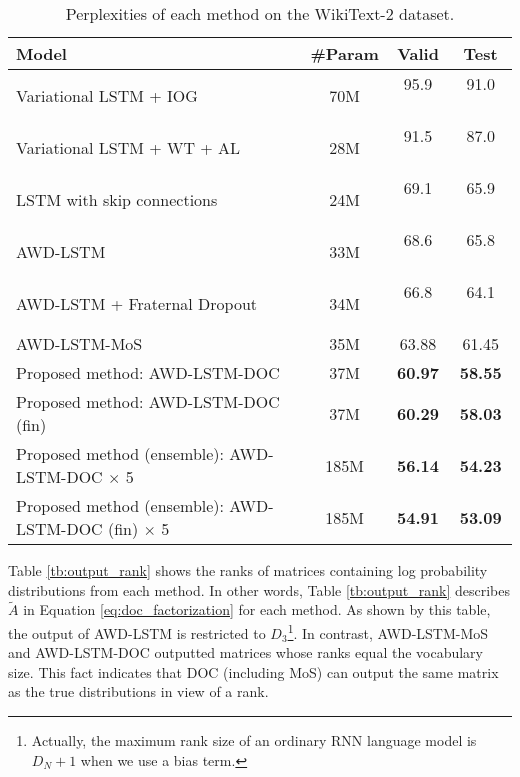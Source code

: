 \documentclass[11pt,a4paper]{article}
\begin{document}
\begin{table*}[!t]
  \centering
  \small
  \begin{tabular}{| l | c | c c |} \hline
  Model & \#Param & Valid & Test \\ \hline
  Variational LSTM + IOG \cite{takase-suzuki-nagata:2017:I17-2} & 70M & 95.9  \ \  & 91.0 \ \  \\
  Variational LSTM + WT + AL \cite{DBLP:journals/corr/InanKS16} & 28M & 91.5  \ \ & 87.0 \ \  \\
  LSTM with skip connections \cite{DBLP:journals/corr/MelisDB17} & 24M & 69.1  \ \  & 65.9 \ \  \\
  AWD-LSTM \cite{merityRegOpt} & 33M & 68.6  \ \  & 65.8 \ \  \\
  AWD-LSTM + Fraternal Dropout \cite{fraternal} & 34M & 66.8  \ \  & 64.1 \ \  \\
  AWD-LSTM-MoS \cite{DBLP:journals/corr/abs-1711-03953} & 35M & 63.88 & 61.45 \\ \hline
  Proposed method: AWD-LSTM-DOC & 37M & {\bf 60.97} & {\bf 58.55} \\
  Proposed method: AWD-LSTM-DOC (fin) & 37M & {\bf 60.29} & {\bf 58.03} \\
  Proposed method (ensemble): AWD-LSTM-DOC $\times$ 5 & 185M & {\bf 56.14} & {\bf 54.23} \\
  Proposed method (ensemble): AWD-LSTM-DOC (fin) $\times$ 5 & 185M & {\bf 54.91} & {\bf 53.09} \\ \hline
  \end{tabular}
  \caption{Perplexities of each method on the WikiText-2 dataset.\label{tb:perplexityOnWikitext}}
\end{table*}



Table \ref{tb:output_rank} shows the ranks of matrices containing log probability distributions from each method.
In other words, Table \ref{tb:output_rank} describes $\tilde{A}$ in Equation \ref{eq:doc_factorization} for each method.
As shown by this table, the output of AWD-LSTM is restricted to $D_3$\footnote{Actually, the maximum rank size of an ordinary RNN language model is $D_{N} + 1$ when we use a bias term.}.
In contrast, AWD-LSTM-MoS~\cite{DBLP:journals/corr/abs-1711-03953} and AWD-LSTM-DOC outputted matrices whose ranks equal the vocabulary size.
This fact indicates that DOC (including MoS) can output the same matrix as the true distributions in view of a rank.
\end{document}
